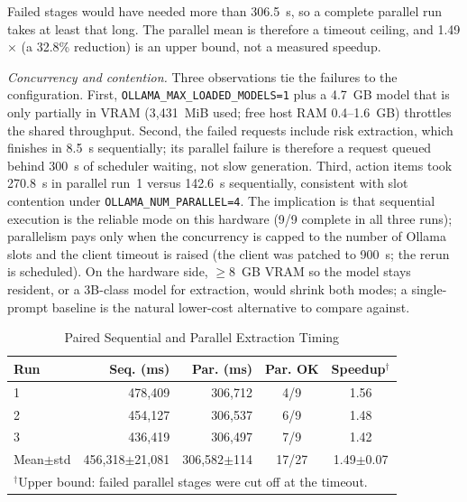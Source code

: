 \documentclass[conference]{IEEEtran}
\begin{document}
Failed stages would have needed more than 306.5~s, so a complete parallel run takes at least that long. The parallel mean is therefore a timeout ceiling, and 1.49$\times$ (a 32.8\% reduction) is an upper bound, not a measured speedup.

\emph{Concurrency and contention.} Three observations tie the failures to the configuration. First, \texttt{OLLAMA\_MAX\_LOADED\_MODELS=1} plus a 4.7~GB model that is only partially in VRAM (3,431~MiB used; free host RAM 0.4--1.6~GB) throttles the shared throughput. Second, the failed requests include risk extraction, which finishes in 8.5~s sequentially; its parallel failure is therefore a request queued behind 300~s of scheduler waiting, not slow generation. Third, action items took 270.8~s in parallel run~1 versus 142.6~s sequentially, consistent with slot contention under \texttt{OLLAMA\_NUM\_PARALLEL=4}. The implication is that sequential execution is the reliable mode on this hardware (9/9 complete in all three runs); parallelism pays only when the concurrency is capped to the number of Ollama slots and the client timeout is raised (the client was patched to 900~s; the rerun is scheduled). On the hardware side, $\ge$8~GB VRAM so the model stays resident, or a 3B-class model for extraction, would shrink both modes; a single-prompt baseline is the natural lower-cost alternative to compare against.

\begin{table}[!t]
\caption{Paired Sequential and Parallel Extraction Timing}
\label{tab:timing}
\centering
\footnotesize
\setlength{\tabcolsep}{2.2pt}
\begin{tabular}{lrrcc}
\toprule
\textbf{Run} & \textbf{Seq. (ms)} & \textbf{Par. (ms)} & \textbf{Par. OK} & \textbf{Speedup$^{\dagger}$}\\
\midrule
1 & 478,409 & 306,712 & 4/9 & 1.56\\
2 & 454,127 & 306,537 & 6/9 & 1.48\\
3 & 436,419 & 306,497 & 7/9 & 1.42\\
\midrule
Mean$\pm$std & 456,318$\pm$21,081 & 306,582$\pm$114 & 17/27 & 1.49$\pm$0.07\\
\bottomrule
\multicolumn{5}{p{0.93\columnwidth}}{\scriptsize $^{\dagger}$Upper bound: failed parallel stages were cut off at the timeout.}
\end{tabular}
\end{table}
\end{document}

